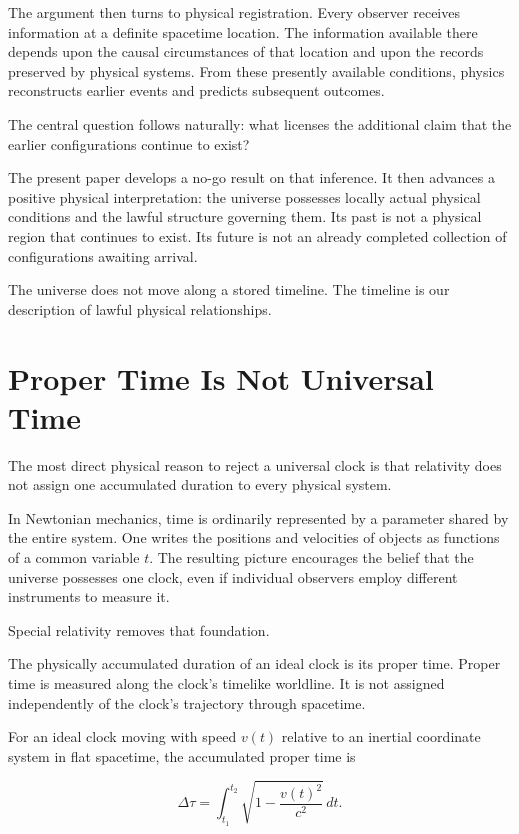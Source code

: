 \documentclass[12pt,onecolumn]{article}
\begin{document}
The argument then turns to physical registration. Every observer receives information at a definite spacetime location. The information available there depends upon the causal circumstances of that location and upon the records preserved by physical systems. From these presently available conditions, physics reconstructs earlier events and predicts subsequent outcomes.

The central question follows naturally: what licenses the additional claim that the earlier configurations continue to exist?

The present paper develops a no-go result on that inference. It then advances a positive physical interpretation: the universe possesses locally actual physical conditions and the lawful structure governing them. Its past is not a physical region that continues to exist. Its future is not an already completed collection of configurations awaiting arrival.

The universe does not move along a stored timeline. The timeline is our description of lawful physical relationships.

\section{Proper Time Is Not Universal Time}

The most direct physical reason to reject a universal clock is that relativity does not assign one accumulated duration to every physical system.

In Newtonian mechanics, time is ordinarily represented by a parameter shared by the entire system. One writes the positions and velocities of objects as functions of a common variable \(t\). The resulting picture encourages the belief that the universe possesses one clock, even if individual observers employ different instruments to measure it.

Special relativity removes that foundation.

The physically accumulated duration of an ideal clock is its proper time. Proper time is measured along the clock's timelike worldline. It is not assigned independently of the clock's trajectory through spacetime.

For an ideal clock moving with speed \(v(t)\) relative to an inertial coordinate system in flat spacetime, the accumulated proper time is

\begin{equation}
\Delta\tau
=
\int_{t_1}^{t_2}
\sqrt{1-\frac{v(t)^2}{c^2}}\,dt.
\end{equation}
\end{document}
